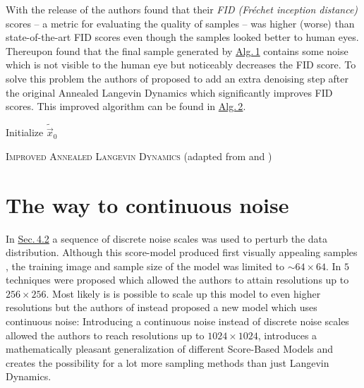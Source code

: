 With the release of \cite{score_1} the authors found that their \textit{FID (Fréchet inception distance)} \cite{fid} scores – a metric for evaluating the quality of samples – was higher (worse) than state-of-the-art FID scores even though the samples looked better to human eyes. Thereupon \cite{score_4} found that the final sample generated by \hyperref[alg:1]{Alg.\,1} contains some noise which is not visible to the human eye but noticeably decreases the FID score. To solve this problem the authors of \cite{score_4} proposed to add an extra denoising step after the original Annealed Langevin Dynamics which significantly improves FID scores. This improved algorithm can be found in \hyperref[alg:2]{Alg.\,2}.
%
\begin{algorithm} \label{alg:2}
    \DontPrintSemicolon
    Initialize $\tilde{\vec{x}}_0$\;
    
    \caption[Improved Annealed Langevin Dynamics]{\textsc{Improved Annealed Langevin Dynamics} (adapted from \cite{score_1} and \cite{score_4})}
\end{algorithm}
\section[The way to continuous noise]{The way to continuous noise%
    } \label{sec:4.4}
In \hyperref[sec:4.2]{Sec.\,4.2} a sequence of discrete noise scales was used to perturb the data distribution. Although this score-model produced first visually appealing samples \cite{score_1}, the training image and sample size of the model was limited to $\sim64\times64$. In \cite{score_2} $5$ techniques were proposed which allowed the authors to attain resolutions up to $256\times256$. Most likely is is possible to scale up this model to even higher resolutions but the authors of \cite{score_3} instead proposed a new model which uses continuous noise: Introducing a continuous noise \cite{score_3} instead of discrete noise scales allowed the authors to reach resolutions up to $1024\times1024$, introduces a mathematically pleasant generalization of different Score-Based Models and creates the possibility for a lot more sampling methods than just Langevin Dynamics.
%
